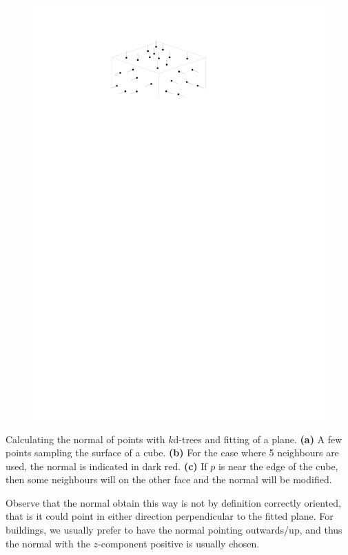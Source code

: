 \begin{marginfigure}
\begin{subfigure}[b]{\linewidth}
    \includegraphics[width=\textwidth,page=3]{normal.pdf}
    \caption{}\label{fig:normal:c}
  \end{subfigure}
  \caption{Calculating the normal of points with $k$d-trees and fitting of a plane. \textbf{(a)} A few points sampling the surface of a cube. \textbf{(b)} For the case where 5 neighbours are used, the normal is indicated in dark red. \textbf{(c)} If $p$ is near the edge of the cube, then some neighbours will on the other face and the normal will be modified.}%
\label{fig:knn_normal}
\end{marginfigure}

%

Observe that the normal obtain this way is not by definition correctly oriented, that is it could point in either direction perpendicular to the fitted plane.
For buildings, we usually prefer to have the normal pointing outwards/up, and thus the normal with the $z$-component positive is usually chosen.

